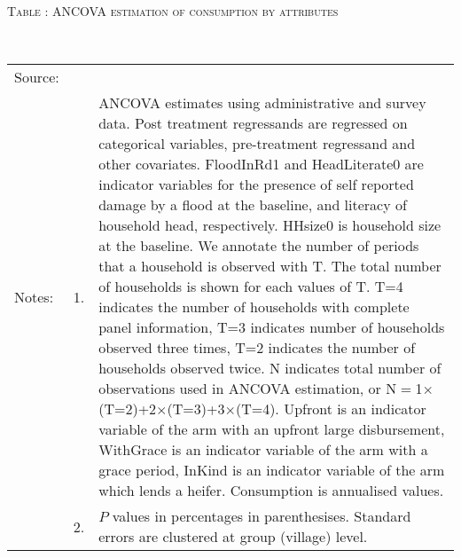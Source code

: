 \hspace{-1cm}\begin{minipage}[t]{14cm}
\hfil\textsc{\normalsize Table \thetable: ANCOVA estimation of consumption by attributes \label{tab ANCOVA consumption attributes original HH}}\\
\setlength{\tabcolsep}{1pt}
\setlength{\baselineskip}{8pt}
\renewcommand{\arraystretch}{.55}
\hfil{}\\
\renewcommand{\arraystretch}{.8}
\setlength{\tabcolsep}{1pt}
\begin{tabular}{>{\hfill\scriptsize}p{1cm}<{}>{\hfill\scriptsize}p{.25cm}<{}>{\scriptsize}p{12cm}<{\hfill}}
Source:& \multicolumn{2}{l}{\scriptsize Estimated with GUK administrative and survey data.}\\
Notes: & 1. & ANCOVA estimates using administrative and survey data. Post treatment regressands are regressed on categorical variables, pre-treatment regressand and other covariates. \textsf{FloodInRd1} and \textsf{HeadLiterate0} are indicator variables for the presence of self reported damage by a flood at the baseline, and literacy of household head, respectively. \textsf{HHsize0} is household size at the baseline. We annotate the number of periods that a household is observed with \textsf{T}. The total number of households is shown for each values of \textsf{T}. \textsf{T=4} indicates the number of households with complete panel information, \textsf{T=3} indicates number of households observed three times, \textsf{T=2} indicates the number of households observed twice. \textsf{N} indicates total number of observations used in ANCOVA estimation, or \textsf{N$=$1$\times$(T=2)+2$\times$(T=3)+3$\times$(T=4)}.  \textsf{Upfront} is an indicator variable of the arm with an upfront large disbursement, \textsf{WithGrace} is an indicator variable of the arm with a grace period, \textsf{InKind} is an indicator variable of the arm which lends a heifer. Consumption is annualised values. \\
& 2. & $P$ values in percentages in parenthesises. Standard errors are clustered at group (village) level.
\end{tabular}
\end{minipage}


